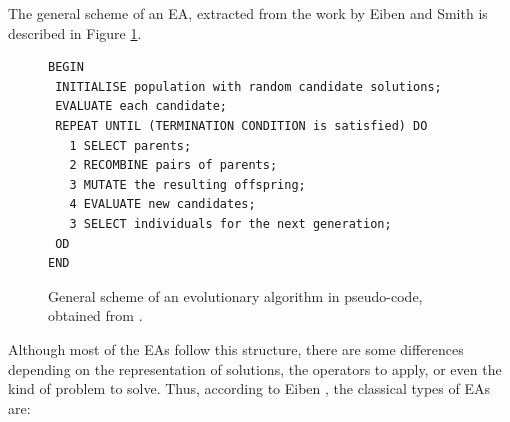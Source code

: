 \documentclass{article}
\begin{document}
The general scheme of an EA, extracted from the work by Eiben and Smith \cite{eiben2010whatis} is described in Figure \ref{fig:basicscheme}.  

\begin{figure}[tb]
\begin{verbatim} 
BEGIN
 INITIALISE population with random candidate solutions;
 EVALUATE each candidate;
 REPEAT UNTIL (TERMINATION CONDITION is satisfied) DO
   1 SELECT parents;
   2 RECOMBINE pairs of parents;
   3 MUTATE the resulting offspring;
   4 EVALUATE new candidates;
   3 SELECT individuals for the next generation;
 OD
END
\end{verbatim}
\caption{General scheme of an evolutionary algorithm in pseudo-code, obtained from \cite{eiben2010whatis}.}
\label{fig:basicscheme}
\end{figure}

Although most of the EAs follow this structure, there are some differences depending on the representation of solutions, the operators to apply, or even the kind of problem to solve. Thus, according to Eiben \cite{eiben2010whatis}, the classical types of EAs are:


\end{document}
